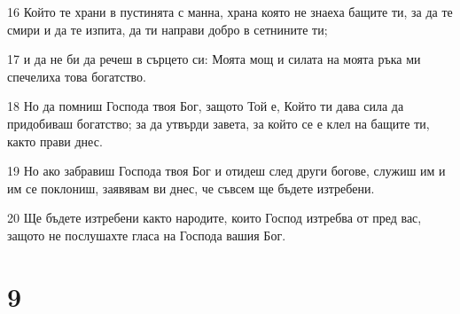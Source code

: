 \par 16 Който те храни в пустинята с манна, храна която не знаеха бащите ти, за да те смири и да те изпита, да ти направи добро в сетнините ти;
\par 17 и да не би да речеш в сърцето си: Моята мощ и силата на моята ръка ми спечелиха това богатство.
\par 18 Но да помниш Господа твоя Бог, защото Той е, Който ти дава сила да придобиваш богатство; за да утвърди завета, за който се е клел на бащите ти, както прави днес.
\par 19 Но ако забравиш Господа твоя Бог и отидеш след други богове, служиш им и им се поклониш, заявявам ви днес, че съвсем ще бъдете изтребени.
\par 20 Ще бъдете изтребени както народите, които Господ изтребва от пред вас, защото не послушахте гласа на Господа вашия Бог.

\chapter{9}

